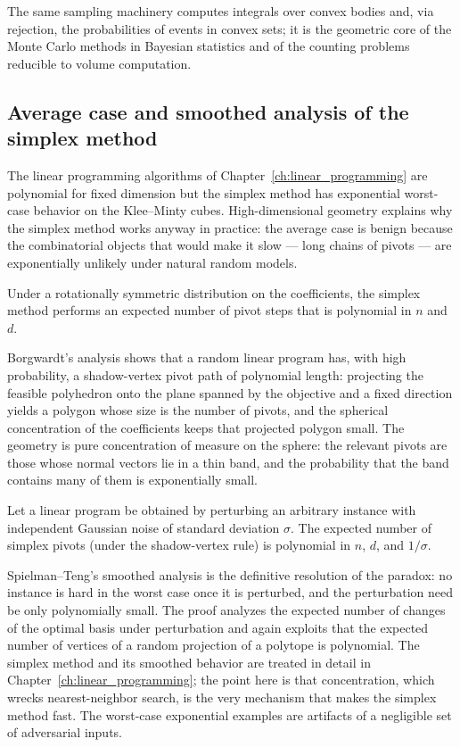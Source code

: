 The same sampling machinery computes integrals over convex bodies and,
via rejection, the probabilities of events in convex sets; it is the geometric
core of the Monte Carlo methods in Bayesian statistics and of the counting
problems reducible to volume computation.

\subsection{Average case and smoothed analysis of the simplex method}

The linear programming algorithms of Chapter~\ref{ch:linear_programming} are
polynomial for fixed dimension but the simplex method has exponential
worst-case behavior on the Klee--Minty cubes. High-dimensional geometry
explains why the simplex method works anyway in practice: the average case is
benign because the combinatorial objects that would make it slow --- long
chains of pivots --- are exponentially unlikely under natural random models.

\begin{theorem}
\label{thm:highdim_borgwardt}
Under a rotationally symmetric distribution on the coefficients, the simplex
method performs an expected number of pivot steps that is polynomial in $n$
and $d$.
\end{theorem}

Borgwardt's analysis shows that a random linear program has, with high
probability, a shadow-vertex pivot path of polynomial length: projecting the
feasible polyhedron onto the plane spanned by the objective and a fixed
direction yields a polygon whose size is the number of pivots, and the
spherical concentration of the coefficients keeps that projected polygon
small. The geometry is pure concentration of measure on the sphere: the
relevant pivots are those whose normal vectors lie in a thin band, and the
probability that the band contains many of them is exponentially small.

\begin{theorem}
\label{thm:highdim_simplex_smoothed}
Let a linear program be obtained by perturbing an arbitrary instance with
independent Gaussian noise of standard deviation $\sigma$. The expected number
of simplex pivots (under the shadow-vertex rule) is polynomial in $n$, $d$,
and $1/\sigma$.
\end{theorem}

Spielman--Teng's smoothed analysis is the definitive resolution of the
paradox: no instance is hard in the worst case once it is perturbed, and the
perturbation need be only polynomially small. The proof analyzes the expected
number of changes of the optimal basis under perturbation and again exploits
that the expected number of vertices of a random projection of a polytope is
polynomial. The simplex method and its smoothed behavior are treated in
detail in Chapter~\ref{ch:linear_programming}; the point here is that
concentration, which wrecks nearest-neighbor search, is the very mechanism
that makes the simplex method fast. The worst-case exponential examples are
artifacts of a negligible set of adversarial inputs.

